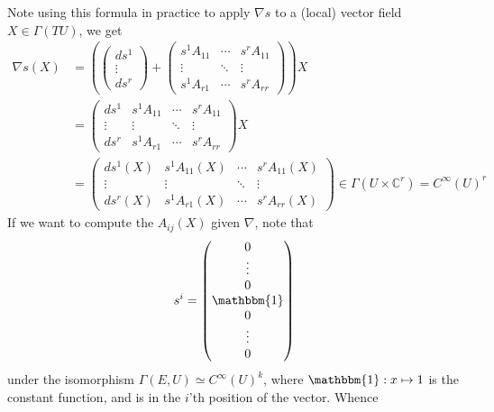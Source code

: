 \documentclass[a4paper]{article}
\theoremstyle{definition} \newtheorem*{definition}{Definition}
\theoremstyle{definition} \newtheorem*{definitions}{Definitions}
\theoremstyle{plain} \newtheorem{theorem}{Theorem}[section]
\theoremstyle{plain} \newtheorem{proposition}[theorem]{Proposition}
\theoremstyle{plain} \newtheorem{corollary}[theorem]{Corollary}
\theoremstyle{plain} \newtheorem{lemma}[theorem]{Lemma}
\theoremstyle{plain} \newtheorem{example}[theorem]{Example}
\newcommand{\complexnos}{\mathbb{C}}
\newcommand{\smooth}{C^\infty}
\begin{document}
Note using this formula in practice to apply $\nabla s$ to a (local) vector field $X\in \Gamma(TU)$, we get
\begin{align*}
    \nabla s (X) & = \left( \begin{pmatrix}ds^1 \\ \vdots \\ ds^r\end{pmatrix} + \begin{pmatrix}
s^1A_{11} & \cdots & s^rA_{11}\\
\vdots & \ddots & \vdots \\
s^1A_{r1} & \cdots & s^rA_{rr}
\end{pmatrix} \right) X \\
& = \begin{pmatrix}
ds^1 & s^1A_{11} & \cdots & s^rA_{11}\\
\vdots & \vdots & \ddots & \vdots \\
ds^r & s^1A_{r1} & \cdots & s^rA_{rr}
\end{pmatrix} X \\
& = \begin{pmatrix}
ds^1(X) & s^1A_{11}(X) & \cdots & s^rA_{11}(X)\\
\vdots & \vdots & \ddots & \vdots \\
ds^r(X) & s^1A_{r1}(X) & \cdots & s^rA_{rr}(X) 
\end{pmatrix} \in \Gamma(U\times \complexnos^r) = \smooth(U)^r
\end{align*}
If we want to compute the $A_{ij}(X)$ given $\nabla$, note that 
$$s^i = \begin{pmatrix}0 \\ \vdots \\ 0 \\ \mathbbm{1} \\ 0 \\ \vdots \\ 0\end{pmatrix}$$
under the isomorphism $\Gamma(E, U)\simeq \smooth(U)^k$, where $\mathbbm{1}:x\mapsto 1$ is the constant function, and is in the $i$'th position of the vector. Whence
\end{document}
